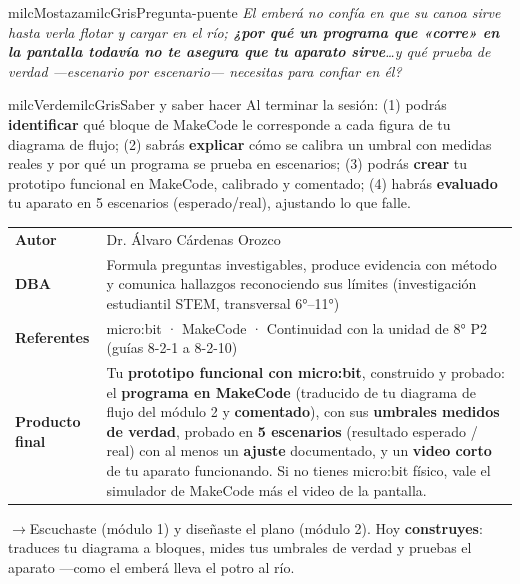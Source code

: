\documentclass[11pt,letterpaper]{article}
\newcommand{\puente}[1]{%
  \begin{puentebox}%
    \textcolor{milcGradeDark}{$\rightarrow$}\hspace{2mm}#1%
  \end{puentebox}%
}
\begin{document}
\begin{softbox}{milcMostaza}{milcGris}{Pregunta-puente}
\textit{El emberá no confía en que su canoa sirve hasta verla flotar y cargar en el río; \textbf{¿por qué un programa que «corre» en la pantalla todavía no te asegura que tu aparato sirve}\ldots y qué prueba de verdad ---escenario por escenario--- necesitas para confiar en él?}
\end{softbox}

\begin{softbox}{milcVerde}{milcGris}{Saber y saber hacer}
Al terminar la sesión: (1) podrás \textbf{identificar} qué bloque de MakeCode le corresponde a cada figura de tu diagrama de flujo; (2) sabrás \textbf{explicar} cómo se calibra un umbral con medidas reales y por qué un programa se prueba en escenarios; (3) podrás \textbf{crear} tu prototipo funcional en MakeCode, calibrado y comentado; (4) habrás \textbf{evaluado} tu aparato en 5 escenarios (esperado/real), ajustando lo que falle.
\end{softbox}



\small
\begin{tabularx}{\textwidth}{>{\bfseries}p{3.0cm}Y}
Autor & Dr. Álvaro Cárdenas Orozco\\
DBA & Formula preguntas investigables, produce evidencia con método y comunica hallazgos reconociendo sus límites (investigación estudiantil STEM, transversal 6°--11°)\\
Referentes & micro:bit · MakeCode · Continuidad con la unidad de 8° P2 (guías 8-2-1 a 8-2-10)\\
Producto final & Tu \textbf{prototipo funcional con micro:bit}, construido y probado: el \textbf{programa en MakeCode} (traducido de tu diagrama de flujo del módulo 2 y \textbf{comentado}), con sus \textbf{umbrales medidos de verdad}, probado en \textbf{5 escenarios} (resultado esperado / real) con al menos un \textbf{ajuste} documentado, y un \textbf{video corto} de tu aparato funcionando. Si no tienes micro:bit físico, vale el simulador de MakeCode más el video de la pantalla.\\
\end{tabularx}
\normalsize

\puente{Escuchaste (módulo 1) y diseñaste el plano (módulo 2). Hoy \textbf{construyes}: traduces tu diagrama a bloques, mides tus umbrales de verdad y pruebas el aparato ---como el emberá lleva el potro al río.}
\end{document}
